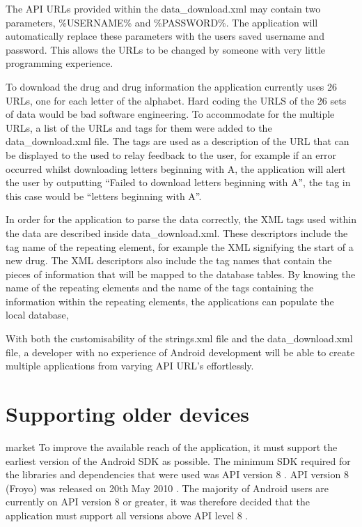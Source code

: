 The API URLs provided within the data\_download.xml may contain two parameters, \%USERNAME\% and \%PASSWORD\%. The application will automatically replace these parameters with the users saved username and password. This allows the URLs to be changed by someone with very little programming experience.

To download the drug and drug information the application currently uses 26 URLs, one for each letter of the alphabet. Hard coding the URLS of the 26 sets of data would be bad software engineering. To accommodate for the multiple URLs, a list of the URLs and tags for them were added to the data\_download.xml file. The tags are used as a description of the URL that can be displayed to the used to relay feedback to the user, for example if an error occurred whilst downloading letters beginning with A, the application will alert the user by outputting “Failed to download letters beginning with A”, the tag in this case would be “letters beginning with A”. 

In order for the application to parse the data correctly, the XML tags \cite{xml} used within the data are described inside data\_download.xml. These descriptors include the tag name of the repeating element, for example the XML signifying the start of a new drug. The XML descriptors also include the tag names that contain the pieces of information that will be mapped to the database tables. By knowing the name of the repeating elements and the name of the tags containing the information within the repeating elements, the applications can populate the local database,

With both the customisability of the strings.xml file and the data\_download.xml file, a developer with no experience of Android development will be able to create multiple applications from varying API URL’s effortlessly. 


\section{Supporting older devices}
market
To improve the available reach of the application, it must support the earliest version of the Android SDK \cite{android_sdk} as possible. The minimum SDK required for the libraries and dependencies that were used was API version 8 \cite{robospice}. API version 8 (Froyo) was released on 20th May 2010 \cite{froyo}. The majority of Android users are currently on API version 8 or greater, it was therefore decided that the application must support all versions above API level 8 \cite{phone_market}.


